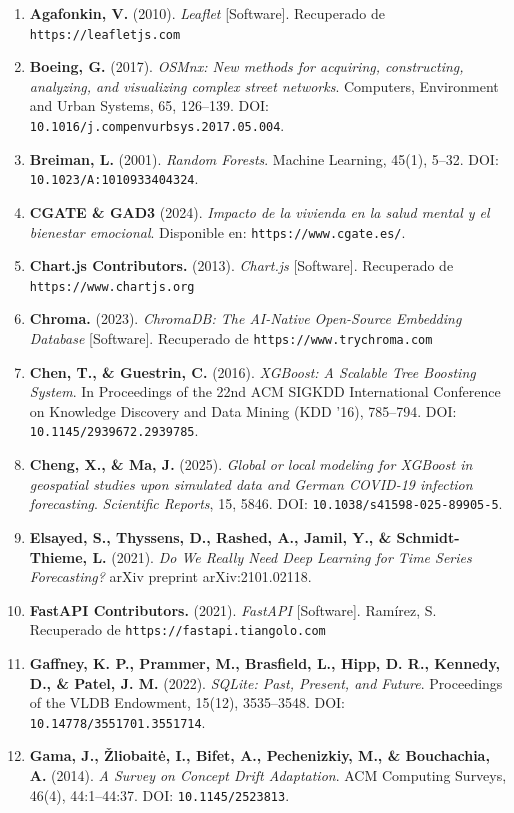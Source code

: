 \documentclass[a4paper,11pt,openany]{book}
\begin{document}
\begin{enumerate}
    \item \textbf{Agafonkin, V.} (2010). \textit{Leaflet} [Software]. Recuperado de \nolinkurl{https://leafletjs.com}
    \item \textbf{Boeing, G.} (2017). \textit{OSMnx: New methods for acquiring, constructing, analyzing, and visualizing complex street networks}. Computers, Environment and Urban Systems, 65, 126--139. DOI: \nolinkurl{10.1016/j.compenvurbsys.2017.05.004}.
    \item \textbf{Breiman, L.} (2001). \textit{Random Forests}. Machine Learning, 45(1), 5--32. DOI: \nolinkurl{10.1023/A:1010933404324}.
    \item \textbf{CGATE \& GAD3} (2024). \textit{Impacto de la vivienda en la salud mental y el bienestar emocional}. Disponible en: \nolinkurl{https://www.cgate.es/}.
    \item \textbf{Chart.js Contributors.} (2013). \textit{Chart.js} [Software]. Recuperado de \nolinkurl{https://www.chartjs.org}
    \item \textbf{Chroma.} (2023). \textit{ChromaDB: The AI-Native Open-Source Embedding Database} [Software]. Recuperado de \nolinkurl{https://www.trychroma.com}
    \item \textbf{Chen, T., \& Guestrin, C.} (2016). \textit{XGBoost: A Scalable Tree Boosting System}. In Proceedings of the 22nd ACM SIGKDD International Conference on Knowledge Discovery and Data Mining (KDD '16), 785--794. DOI: \nolinkurl{10.1145/2939672.2939785}.
    \item \textbf{Cheng, X., \& Ma, J.} (2025). \textit{Global or local modeling for XGBoost in geospatial studies upon simulated data and German COVID-19 infection forecasting}. \textit{Scientific Reports}, 15, 5846. DOI: \nolinkurl{10.1038/s41598-025-89905-5}.
    \item \textbf{Elsayed, S., Thyssens, D., Rashed, A., Jamil, Y., \& Schmidt-Thieme, L.} (2021). \textit{Do We Really Need Deep Learning for Time Series Forecasting?} arXiv preprint arXiv:2101.02118.
    \item \textbf{FastAPI Contributors.} (2021). \textit{FastAPI} [Software]. Ram\'{i}rez, S. Recuperado de \nolinkurl{https://fastapi.tiangolo.com}
    \item \textbf{Gaffney, K. P., Prammer, M., Brasfield, L., Hipp, D. R., Kennedy, D., \& Patel, J. M.} (2022). \textit{SQLite: Past, Present, and Future}. Proceedings of the VLDB Endowment, 15(12), 3535--3548. DOI: \nolinkurl{10.14778/3551701.3551714}.
    \item \textbf{Gama, J., Žliobaitė, I., Bifet, A., Pechenizkiy, M., \& Bouchachia, A.} (2014). \textit{A Survey on Concept Drift Adaptation}. ACM Computing Surveys, 46(4), 44:1--44:37. DOI: \nolinkurl{10.1145/2523813}.

\end{enumerate}
\end{document}
